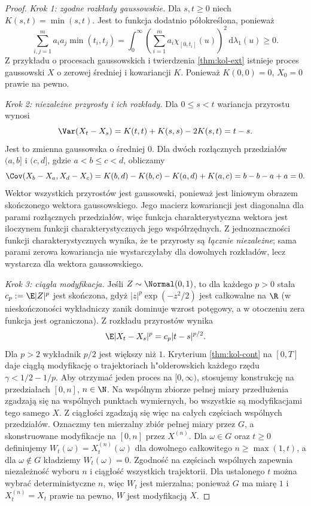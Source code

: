 \begin{proof}
\emph{Krok 1: zgodne rozkłady gaussowskie.}
Dla $s,t\ge0$ niech $K(s,t)=\min(s,t)$.
Jest to funkcja dodatnio półokreślona, ponieważ
\[
\sum_{i,j=1}^m a_ia_j\min(t_i,t_j)
=\int_0^\infty
\left(\sum_{i=1}^m a_i\chi_{[0,t_i]}(u)\right)^2
\,\mathrm d\lambda_1(u)\ge0.
\]
Z przykładu o procesach gaussowskich i twierdzenia
\ref{thm:kol-ext} istnieje proces gaussowski $X$
o zerowej średniej i kowariancji $K$.
Ponieważ $K(0,0)=0$, $X_0=0$ prawie na pewno.

\emph{Krok 2: niezależne przyrosty i ich rozkłady.}
Dla $0\le s<t$ wariancja przyrostu wynosi
\[
\Var(X_t-X_s)=K(t,t)+K(s,s)-2K(s,t)=t-s.
\]
Jest to zmienna gaussowska o średniej $0$.
Dla dwóch rozłącznych przedziałów $(a,b]$ i $(c,d]$,
gdzie $a<b\le c<d$, obliczamy
\[
\Cov(X_b-X_a,X_d-X_c)
=K(b,d)-K(b,c)-K(a,d)+K(a,c)
=b-b-a+a=0.
\]
Wektor wszystkich przyrostów jest gaussowski, ponieważ
jest liniowym obrazem skończonego wektora gaussowskiego.
Jego macierz kowariancji jest diagonalna dla
parami rozłącznych przedziałów, więc funkcja charakterystyczna
wektora jest iloczynem funkcji charakterystycznych jego
współrzędnych. Z jednoznaczności funkcji charakterystycznych
wynika, że te przyrosty są \emph{łącznie niezależne}; sama parami zerowa kowariancja
nie wystarczyłaby dla dowolnych rozkładów, lecz wystarcza
dla wektora gaussowskiego.

\emph{Krok 3: ciągła modyfikacja.}
Jeśli $Z\sim\Normal(0,1)$, to dla każdego $p>0$
stała $c_p:=\E|Z|^p$ jest skończona, gdyż
$|z|^p\exp(-z^2/2)$ jest całkowalne na $\R$
(w nieskończoności wykładniczy zanik dominuje wzrost
potęgowy, a w otoczeniu zera funkcja jest ograniczona).
Z rozkładu przyrostów wynika
\[
\E|X_t-X_s|^p=c_p|t-s|^{p/2}.
\]
Dla $p>2$ wykładnik $p/2$ jest większy niż $1$.
Kryterium \ref{thm:kol-cont} na $[0,T]$ daje
ciągłą modyfikację o trajektoriach h"olderowskich
każdego rzędu $\gamma<1/2-1/p$.
Aby otrzymać jeden proces na $[0,\infty)$, stosujemy
konstrukcję na przedziałach $[0,n]$, $n\in\N$.
Na wspólnym zbiorze pełnej miary przedłużenia
zgadzają się na wspólnych punktach wymiernych,
bo wszystkie są modyfikacjami tego samego $X$.
Z ciągłości zgadzają się więc na całych częściach wspólnych
przedziałów. Oznaczmy ten mierzalny zbiór pełnej miary przez $G$,
a skonstruowane modyfikacje na $[0,n]$ przez $X^{(n)}$.
Dla $\omega\in G$ oraz $t\ge0$ definiujemy
$W_t(\omega)=X_t^{(n)}(\omega)$ dla dowolnego całkowitego
$n\ge\max(1,t)$, a dla $\omega\notin G$ kładziemy
$W_t(\omega)=0$. Zgodność na częściach wspólnych
zapewnia niezależność wyboru $n$ i ciągłość wszystkich
trajektorii. Dla ustalonego $t$ można wybrać deterministyczne
$n$, więc $W_t$ jest mierzalna; ponieważ $G$ ma miarę $1$
i $X_t^{(n)}=X_t$ prawie na pewno, $W$ jest modyfikacją $X$.


\end{proof}
